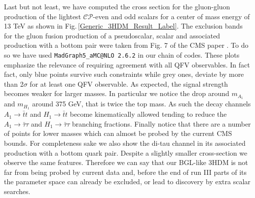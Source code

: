 \documentclass[10pt]{report}
\begin{document}
Last but not least, we have computed the cross section for the gluon-gluon production of the lightest $\mathcal{CP}$-even and odd scalars for a center of mass energy of 13 TeV as shown in Fig.\,\ref{Generic_3HDM_Result_Label}. 
%
The exclusion bands for the gluon fusion production of a pseudoscalar, scalar and associated production with a bottom pair were taken from Fig. 7 of the CMS paper \cite{Sirunyan_2018}. 
% 
To do so we have used \texttt{MadGraph5\_aMC@NLO 2.6.2} in our chain of codes. 
% 
These plots emphasize the relevance of requiring agreement with all QFV observables. 
% 
In fact fact, only blue points survive such constraints while grey ones, deviate by more than 2$\sigma$ for at least one QFV observable. 
%
As expected, the signal strength becomes weaker for larger masses. In particular we notice the drop around $m_{A_1}$ and $m_{H_1}$ around 375 GeV, that is twice the top mass. As such the decay channels $A_1 \to \bar{t}t$ and $H_1 \to \bar{t}t$ become kinematically allowed tending to reduce the $A_1 \to \bar{\tau} \tau$ and $H_1 \to \bar{\tau} \tau$ branching fractions.
%
Finally notice that there are a number of points for lower masses which can almost be probed by the current CMS bounds. For completeness sake we also show the di-tau channel in its associated production with a bottom quark pair. Despite a slightly smaller cross-section we observe the same features. Therefore we can say that our BGL-like 3HDM is not far from being probed by current data and, before the end of run III parts of its the parameter space can already be excluded, or lead to discovery by extra scalar searches. 
\end{document}
